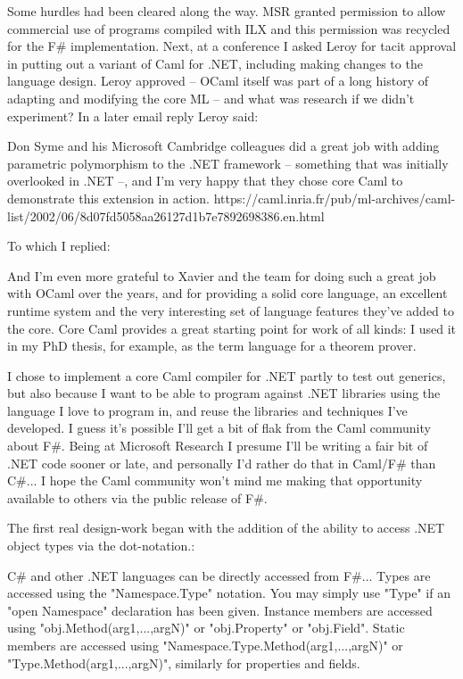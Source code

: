 \documentclass[acmsmall,review]{acmart}\settopmatter{printfolios=true,printccs=false,printacmref=false}
\begin{document}
Some hurdles had been cleared along the way. MSR granted permission to allow commercial use of programs compiled with ILX and this permission was recycled for the F\# implementation. Next, at a conference I asked Leroy for tacit approval in putting out a variant of Caml for .NET, including making changes to the language design.  Leroy approved – OCaml itself was part of a long history of adapting and modifying the core ML – and what was research if we didn’t experiment?  In a later email reply Leroy said:

\begin{verbquote}
Don Syme and his Microsoft Cambridge colleagues did a great job with adding parametric polymorphism to the .NET framework -- something that was initially overlooked in .NET --, and I'm very happy that they chose core Caml to demonstrate this extension in action. https://caml.inria.fr/pub/ml-archives/caml-list/2002/06/8d07fd5058aa26127d1b7e7892698386.en.html 
\end{verbquote}

To which I replied:
\begin{verbquote}
And I'm even more grateful to Xavier and the team for doing such a great job with OCaml over the years, and for providing a solid core language, an excellent runtime system and the very interesting set of language features they've added to the core.  Core Caml provides a great starting point for work of all kinds: I used it in my PhD thesis, for example, as the term language for a theorem prover.

I chose to implement a core Caml compiler for .NET partly to test out generics, but also because I want to be able to program against .NET libraries using the language I love to program in, and reuse the libraries and techniques I've developed.  I guess it's possible I'll get a bit of flak from the Caml community about F\#.  Being at Microsoft Research I presume I'll be writing a fair bit of .NET code sooner or late, and personally I'd rather do that in Caml/F\# than C\#... I hope the Caml community won't mind me making that opportunity available to others via the public release of F\#.  
\end{verbquote}
The first real design-work began with the addition of the ability to access .NET object types via the dot-notation.:
\begin{verbquote}
C\# and other .NET languages can be directly accessed from F\#...  Types are accessed using the "Namespace.Type" notation.  You may simply use "Type" if an "open Namespace" declaration has been given. Instance members are accessed using "obj.Method(arg1,...,argN)" or "obj.Property" or "obj.Field". Static members are accessed using "Namespace.Type.Method(arg1,...,argN)" or "Type.Method(arg1,...,argN)", similarly for properties and fields. 
\end{verbquote}
\end{document}
